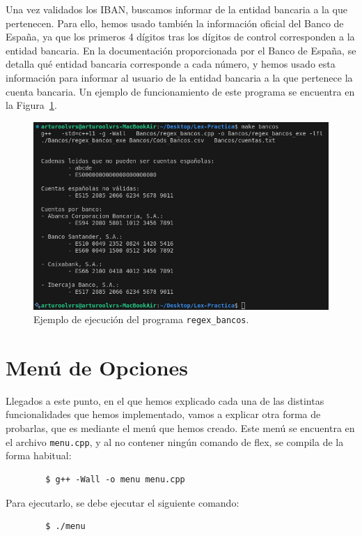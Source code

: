 \documentclass[12pt]{article}
\begin{document}
    Una vez validados los IBAN, buscamos informar de la entidad bancaria a la que pertenecen. Para ello, hemos usado también la información oficial del Banco de España, ya que los primeros 4 dígitos tras los dígitos de control corresponden a la entidad bancaria. En la documentación proporcionada por el Banco de España, se detalla qué entidad bancaria corresponde a cada número, y hemos usado esta información para informar al usuario de la entidad bancaria a la que pertenece la cuenta bancaria. Un ejemplo de funcionamiento de este programa se encuentra en la Figura~\ref{fig:bancos}.
    \begin{figure}
        \centering
        \includegraphics[width=\textwidth]{Img/Funcionamiento_Bancos.png}
        \caption{Ejemplo de ejecución del programa \texttt{regex\_bancos}.}
        \label{fig:bancos}
    \end{figure}

    \section{Menú de Opciones}

    Llegados a este punto, en el que hemos explicado cada una de las distintas funcionalidades que hemos implementado, vamos a explicar otra forma de probarlas, que es mediante el menú que hemos creado. Este menú se encuentra en el archivo \verb|menu.cpp|, y al no contener ningún comando de flex, se compila de la forma habitual:
    \begin{verbatim}
        $ g++ -Wall -o menu menu.cpp
    \end{verbatim}

    Para ejecutarlo, se debe ejecutar el siguiente comando:
    \begin{verbatim}
        $ ./menu
    \end{verbatim}
\end{document}

